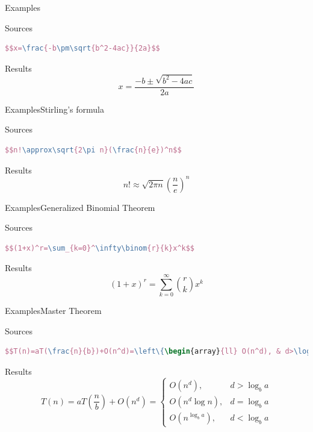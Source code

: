 \documentclass[mathserif]{beamer}
\begin{document}
\begin{frame}[fragile]{Examples}{}
\begin{alertblock}{Sources}
\begin{lstlisting}[language=TeX]
$$x=\frac{-b\pm\sqrt{b^2-4ac}}{2a}$$
\end{lstlisting}
\end{alertblock}
\begin{exampleblock}{Results}
$$x=\frac{-b\pm\sqrt{b^2-4ac}}{2a}$$
\end{exampleblock}
\end{frame}

\begin{frame}[fragile]{Examples}{Stirling's formula}
\begin{alertblock}{Sources}
\begin{lstlisting}[language=TeX]
$$n!\approx\sqrt{2\pi n}(\frac{n}{e})^n$$
\end{lstlisting}
\end{alertblock}
\begin{exampleblock}{Results}
$$n!\approx\sqrt{2\pi n}(\frac{n}{e})^n$$
\end{exampleblock}
\end{frame}

\begin{frame}[fragile]{Examples}{Generalized Binomial Theorem}
\begin{alertblock}{Sources}
\begin{lstlisting}[language=TeX]
$$(1+x)^r=\sum_{k=0}^\infty\binom{r}{k}x^k$$
\end{lstlisting}
\end{alertblock}
\begin{exampleblock}{Results}
$$(1+x)^r=\sum_{k=0}^\infty\binom{r}{k}x^k$$
\end{exampleblock}
\end{frame}

\begin{frame}[fragile]{Examples}{Master Theorem}
\begin{alertblock}{Sources}
\begin{lstlisting}[language=TeX]
$$T(n)=aT(\frac{n}{b})+O(n^d)=\left\{\begin{array}{ll} O(n^d), & d>\log_b a \\ O(n^d\log n), & d=\log_b a \\ O(n^{\log_b a}),&d<\log_b a \end{array}\right.$$
\end{lstlisting}
\end{alertblock}
\begin{exampleblock}{Results}
$$T(n) = aT(\frac{n}{b}) + O(n^d) = \left\{\begin{array}{ll}O(n^d), & d > \log_b a\\O(n^d\log n), & d =\log_b a\\O(n^{\log_b a}), & d < \log_b a\end{array}\right.$$
\end{exampleblock}
\end{frame}
\end{document}
